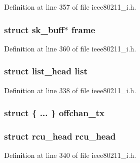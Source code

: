 Definition at line 357 of file ieee80211\-\_\-i.\-h.

\hypertarget{structieee80211__work_a7ddb066bb78029e2130c2ccb2bf3ac08}{
\subsubsection[{frame}]{\setlength{\rightskip}{0pt plus 5cm}struct sk\-\_\-buff$\ast$ frame}}\label{structieee80211__work_a7ddb066bb78029e2130c2ccb2bf3ac08}


Definition at line 360 of file ieee80211\-\_\-i.\-h.

\hypertarget{structieee80211__work_a1f00f18b91d5a820f2c43064243aa86e}{
\subsubsection[{list}]{\setlength{\rightskip}{0pt plus 5cm}struct list\-\_\-head list}}\label{structieee80211__work_a1f00f18b91d5a820f2c43064243aa86e}


Definition at line 338 of file ieee80211\-\_\-i.\-h.

\hypertarget{structieee80211__work_ab765c48f0901d818729d7a4031f0a284}{
\subsubsection[{offchan\-\_\-tx}]{\setlength{\rightskip}{0pt plus 5cm}struct \{ ... \}   offchan\-\_\-tx}}\label{structieee80211__work_ab765c48f0901d818729d7a4031f0a284}
\hypertarget{structieee80211__work_ab698383409a24791490f962fe6990655}{
\subsubsection[{rcu\-\_\-head}]{\setlength{\rightskip}{0pt plus 5cm}struct rcu\-\_\-head rcu\-\_\-head}}\label{structieee80211__work_ab698383409a24791490f962fe6990655}


Definition at line 340 of file ieee80211\-\_\-i.\-h.

